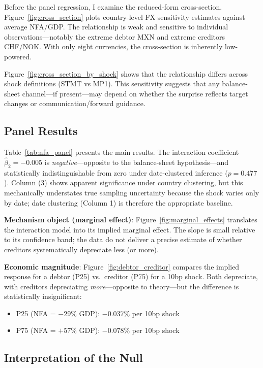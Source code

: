 \documentclass[12pt]{article}
\begin{document}
Before the panel regression, I examine the reduced-form cross-section. Figure~\ref{fig:cross_section} plots country-level FX sensitivity estimates against average NFA/GDP. The relationship is weak and sensitive to individual observations---notably the extreme debtor MXN and extreme creditors CHF/NOK. With only eight currencies, the cross-section is inherently low-powered.

Figure~\ref{fig:cross_section_by_shock} shows that the relationship differs across shock definitions (STMT vs MP1). This sensitivity suggests that any balance-sheet channel---if present---may depend on whether the surprise reflects target changes or communication/forward guidance.

\subsection{Panel Results}

Table~\ref{tab:nfa_panel} presents the main results. The interaction coefficient $\hat{\beta}_2 = -0.005$ is \textit{negative}---opposite to the balance-sheet hypothesis---and statistically indistinguishable from zero under date-clustered inference ($p = 0.477$). Column (3) shows apparent significance under country clustering, but this mechanically understates true sampling uncertainty because the shock varies only by date; date clustering (Column 1) is therefore the appropriate baseline.

\textbf{Mechanism object (marginal effect)}: Figure~\ref{fig:marginal_effects} translates the interaction model into its implied marginal effect. The slope is small relative to its confidence band; the data do not deliver a precise estimate of whether creditors systematically depreciate less (or more).

\textbf{Economic magnitude}: Figure~\ref{fig:debtor_creditor} compares the implied response for a debtor (P25) vs.\ creditor (P75) for a 10bp shock. Both depreciate, with creditors depreciating \textit{more}---opposite to theory---but the difference is statistically insignificant:
\begin{itemize}
    \item P25 (NFA = $-29\%$ GDP): $-0.037\%$ per 10bp shock
    \item P75 (NFA = $+57\%$ GDP): $-0.078\%$ per 10bp shock
\end{itemize}

\subsection{Interpretation of the Null}
\end{document}

